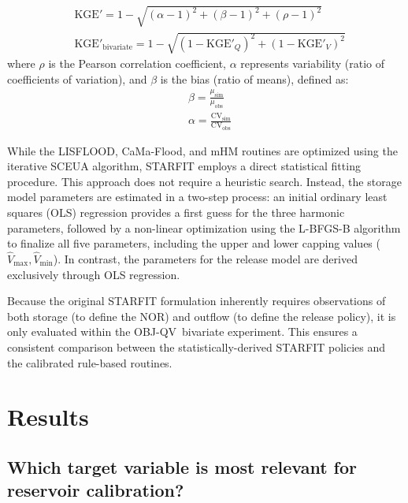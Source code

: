 \documentclass[hess, manuscript]{copernicus}
\newcommand{\calQV}{OBJ-QV}
\begin{document}
{\small
\begin{subequations}
    \label{eq:metrics}
    \begin{align}
        &\text{KGE}' = 1 - \sqrt{(\alpha - 1)^2+ (\beta - 1)^2 + (\rho - 1)^2 } \label{eq:kge} \\
        &\text{KGE}'_{\text{bivariate}} = 1 - \sqrt{(1 - \text{KGE}'_Q)^2 + (1 - \text{KGE}'_V)^2} \label{eq:kge_bivariate}
    \end{align}
\end{subequations}
}
where $\rho$ is the Pearson correlation coefficient, $\alpha$ represents variability (ratio of coefficients of variation), and $\beta$ is the bias (ratio of means), defined as:
{\small
\begin{align}
    &\beta = \frac{\mu_{\text{sim}}}{\mu_{\text{obs}}} \label{eq:kge_beta} \\
    &\alpha = \frac{\text{CV}_{\text{sim}}}{\text{CV}_{\text{obs}}} \label{eq:kge_alpha}
\end{align}
}

While the LISFLOOD, CaMa-Flood, and mHM routines are optimized using the iterative SCEUA algorithm, STARFIT employs a direct statistical fitting procedure. This approach does not require a heuristic search. Instead, the storage model parameters are estimated in a two-step process: an initial ordinary least squares (OLS) regression provides a first guess for the three harmonic parameters, followed by a non-linear optimization using the L-BFGS-B algorithm to finalize all five parameters, including the upper and lower capping values ($\hat{V}_{\max}, \hat{V}_{\min}$). In contrast, the parameters for the release model are derived exclusively through OLS regression.

Because the original STARFIT formulation inherently requires observations of both storage (to define the NOR) and outflow (to define the release policy), it is only evaluated within the \calQV\ bivariate experiment. This ensures a consistent comparison between the statistically-derived STARFIT policies and the calibrated rule-based routines.

\section{Results}
\label{sec:results}

\subsection{Which target variable is most relevant for reservoir calibration?}
\label{sec:compare_variables}
\end{document}
